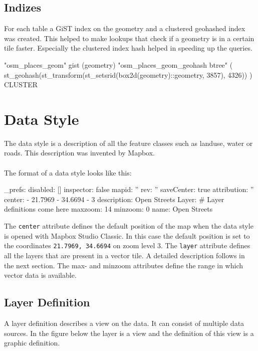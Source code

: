 \subsection{Indizes}

For each table a GiST\cite{87_postgresql.org_2015} index on the geometry and a clustered geohashed index was created. This helped to make lookups that check if a geometry is in a certain tile faster. Especially the clustered index hash helped in speeding up the queries.

\begin{sqlcode}
"osm_places_geom" gist (geometry)
"osm_places_geom_geohash btree" (
    st_geohash(st_transform(st_setsrid(box2d(geometry)::geometry, 3857), 4326))
) CLUSTER
\end{sqlcode}
\newpage

\section{Data Style}\label{data_style}

The data style is a description of all the feature classes such as landuse, water or roads. This description was invented by Mapbox.
\\\\
The format of a data style looks like this:
\begin{yamlcode}
_prefs: 
  disabled: []
  inspector: false
  mapid: ''
  rev: ''
  saveCenter: true
attribution: ''
center: 
  - 21.7969
  - 34.6694
  - 3
description: Open Streets
Layer: 
    # Layer definitions come here
maxzoom: 14
minzoom: 0
name: Open Streets
\end{yamlcode}

The \texttt{center} attribute defines the default position of the map when the data style is opened with Mapbox Studio Classic. In this case the default position is set to the coordinates \texttt{21.7969, 34.6694} on zoom level 3. The \texttt{layer} attribute defines all the layers that are present in a vector tile. A detailed description follows in the next section. The max- and minzoom attributes define the range in which vector data is available.
\newpage
\subsection{Layer Definition}\label{layer_definition}
A layer definition describes a view on the data. It can consist of multiple data sources. In the figure below the layer is a view and the definition of this view is a graphic definition.


